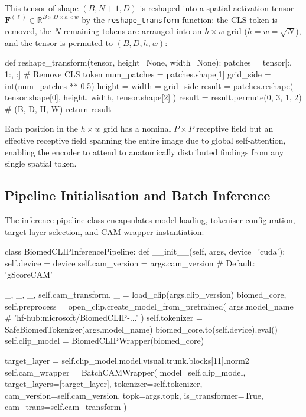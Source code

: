 This tensor of shape $(B, N+1, D)$ is reshaped into a spatial activation tensor $\mathbf{F}^{(\ell)} \in \mathbb{R}^{B \times D \times h \times w}$ by the \texttt{reshape\_transform} function: the CLS token is removed, the $N$ remaining tokens are arranged into an $h \times w$ grid ($h = w = \sqrt{N}$), and the tensor is permuted to $(B, D, h, w)$:

\begin{pythoncode}
def reshape_transform(tensor, height=None, width=None):
    patches = tensor[:, 1:, :]  # Remove CLS token
    num_patches = patches.shape[1]
    grid_side = int(num_patches ** 0.5)
    height = width = grid_side
    result = patches.reshape(
        tensor.shape[0], height, width, tensor.shape[2]
    )
    result = result.permute(0, 3, 1, 2)  # (B, D, H, W)
    return result
\end{pythoncode}

Each position in the $h \times w$ grid has a nominal $P \times P$ receptive field but an effective receptive field spanning the entire image due to global self-attention, enabling the encoder to attend to anatomically distributed findings from any single spatial token.

\subsection{Pipeline Initialisation and Batch Inference}

The inference pipeline class encapsulates model loading, tokeniser configuration, target layer selection, and CAM wrapper instantiation:

\begin{pythoncode}[BiomedCLIPInferencePipeline]
class BiomedCLIPInferencePipeline:
    def __init__(self, args, device='cuda'):
        self.device = device
        self.cam_version = args.cam_version  # Default: 'gScoreCAM'

        _, _, _, self.cam_transform, _ = load_clip(args.clip_version)
        biomed_core, self.preprocess = open_clip.create_model_from_pretrained(
            args.model_name  # 'hf-hub:microsoft/BiomedCLIP-...'
        )
        self.tokenizer = SafeBiomedTokenizer(args.model_name)
        biomed_core.to(self.device).eval()
        self.clip_model = BiomedCLIPWrapper(biomed_core)

        target_layer = self.clip_model.model.visual.trunk.blocks[11].norm2
        self.cam_wrapper = BatchCAMWrapper(
            model=self.clip_model,
            target_layers=[target_layer],
            tokenizer=self.tokenizer,
            cam_version=self.cam_version,
            topk=args.topk,
            is_transformer=True,
            cam_trans=self.cam_transform
        )
\end{pythoncode}

